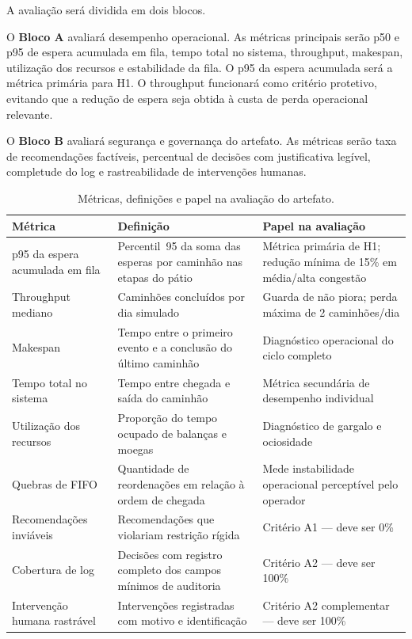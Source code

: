 \documentclass[
  12pt,
  oneside,
  a4paper,
  sumario=tradicional,
  brazil
]{abntex2}
\begin{document}
A avalia\c{c}\~ao ser\'a dividida em dois blocos.

O \textbf{Bloco A} avaliar\'a desempenho operacional. As m\'etricas principais ser\~ao p50 e p95 de espera acumulada em fila, tempo total no sistema, throughput, makespan, utiliza\c{c}\~ao dos recursos e estabilidade da fila. O p95 da espera acumulada ser\'a a m\'etrica prim\'aria para H1. O throughput funcionar\'a como crit\'erio protetivo, evitando que a redu\c{c}\~ao de espera seja obtida \`a custa de perda operacional relevante.

O \textbf{Bloco B} avaliar\'a seguran\c{c}a e governan\c{c}a do artefato. As m\'etricas ser\~ao taxa de recomenda\c{c}\~oes fact\'iveis, percentual de decis\~oes com justificativa leg\'ivel, completude do log e rastreabilidade de interven\c{c}\~oes humanas.

\begin{table}[H]
\centering
\small
\renewcommand{\arraystretch}{1.20}
\begin{tabularx}{\textwidth}{@{}P{0.26\textwidth}P{0.30\textwidth}Y@{}}
\toprule
\textbf{M\'etrica} & \textbf{Defini\c{c}\~ao} & \textbf{Papel na avalia\c{c}\~ao} \\
\midrule
p95 da espera acumulada em fila & Percentil~95 da soma das esperas por caminh\~ao nas etapas do p\'atio & M\'etrica prim\'aria de H1; redu\c{c}\~ao m\'inima de 15\% em m\'edia/alta congest\~ao \\
\addlinespace
Throughput mediano & Caminh\~oes conclu\'idos por dia simulado & Guarda de n\~ao piora; perda m\'axima de 2 caminh\~oes/dia \\
\addlinespace
Makespan & Tempo entre o primeiro evento e a conclus\~ao do \'ultimo caminh\~ao & Diagn\'ostico operacional do ciclo completo \\
\addlinespace
Tempo total no sistema & Tempo entre chegada e sa\'ida do caminh\~ao & M\'etrica secund\'aria de desempenho individual \\
\addlinespace
Utiliza\c{c}\~ao dos recursos & Propor\c{c}\~ao do tempo ocupado de balan\c{c}as e moegas & Diagn\'ostico de gargalo e ociosidade \\
\addlinespace
Quebras de FIFO & Quantidade de reordena\c{c}\~oes em rela\c{c}\~ao \`a ordem de chegada & Mede instabilidade operacional percept\'ivel pelo operador \\
\addlinespace
Recomenda\c{c}\~oes invi\'aveis & Recomenda\c{c}\~oes que violariam restri\c{c}\~ao r\'igida & Crit\'erio A1 --- deve ser 0\% \\
\addlinespace
Cobertura de log & Decis\~oes com registro completo dos campos m\'inimos de auditoria & Crit\'erio A2 --- deve ser 100\% \\
\addlinespace
Interven\c{c}\~ao humana rastr\'avel & Interven\c{c}\~oes registradas com motivo e identifica\c{c}\~ao & Crit\'erio A2 complementar --- deve ser 100\% \\
\bottomrule
\end{tabularx}
\caption{M\'etricas, defini\c{c}\~oes e papel na avalia\c{c}\~ao do artefato.}
\end{table}
\end{document}
